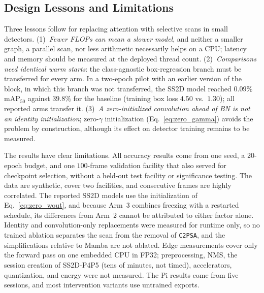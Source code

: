 \subsection{Design Lessons and Limitations}
\label{sec:limitations}
Three lessons follow for replacing attention with selective scans in small detectors. (1)~\emph{Fewer FLOPs can mean a slower model}, and neither a smaller graph, a parallel scan, nor less arithmetic necessarily helps on a CPU; latency and memory should be measured at the deployed thread count. (2)~\emph{Comparisons need identical warm starts}: the class-agnostic box-regression branch must be transferred for every arm. In a two-epoch pilot with an earlier version of the block, in which this branch was not transferred, the SS2D model reached $0.09\%$ $\text{mAP}_{50}$ against $39.8\%$ for the baseline (training box loss $4.50$ vs.\ $1.30$); all reported arms transfer it. (3)~\emph{A zero-initialized convolution ahead of BN is not an identity initialization}; zero-$\gamma$ initialization (Eq.~\eqref{eq:zero_gamma}) avoids the problem by construction, although its effect on detector training remains to be measured.

The results have clear limitations. All accuracy results come from one seed, a 20-epoch budget, and one $100$-frame validation facility that also served for checkpoint selection, without a held-out test facility or significance testing. The data are synthetic, cover two facilities, and consecutive frames are highly correlated. The reported SS2D models use the initialization of Eq.~\eqref{eq:zero_wout}, and because Arm~3 combines freezing with a restarted schedule, its differences from Arm~2 cannot be attributed to either factor alone. Identity and convolution-only replacements were measured for runtime only, so no trained ablation separates the scan from the removal of \texttt{C2PSA}, and the simplifications relative to Mamba are not ablated. Edge measurements cover only the forward pass on one embedded CPU in FP32; preprocessing, NMS, the session creation of SS2D-P4P5 (tens of minutes, not timed), accelerators, quantization, and energy were not measured. The Pi results come from five sessions, and most intervention variants use untrained exports.
